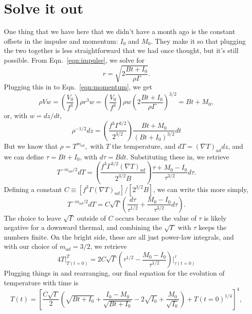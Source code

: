 \documentclass[onecolumn, amsmath, amsfonts, amssymb]{aastex62}
\newcommand{\grad}{\ensuremath{\nabla}}
\begin{document}
\section{Solve it out}
One thing that we have here that we didn't have a month ago is the constant offsets in
the impulse and momentum: $I_0$ and $M_0$.  They make it so that plugging the two together
is less straightforward that we had once thought, but it's still possible. From 
Eqn.~\ref{eqn:impulse}, we solve for
\begin{equation}
r = \sqrt{2\frac{B t + I_0}{\rho\Gamma}}.
\end{equation}
Plugging this in to Eqn.~\ref{eqn:momentum}, we get
\begin{equation}
\rho V w = \left(\frac{V_0}{f^3}\right)\rho r^3 w
= \left(\frac{V_0}{f^3}\right)\rho w \left(2\frac{B t + I_0}{\rho\Gamma}\right)^{3/2} = Bt + M_0,
\end{equation}
or, with $w = dz/dt$,
\begin{equation}
\rho^{-1/2}dz = \left(\frac{f^3 \Gamma^{3/2}}{2^{3/2}}\right)\frac{Bt + M_0}{(Bt + I_0)^{3/2}}dt
\end{equation}
But we know that $\rho = T^{m_{ad}},$ with $T$ the temperature, and $dT = (\grad T)_{ad} dz$,
and we can define $\tau = Bt + I_0$, with $d\tau = B dt$. Substituting these in, we retrieve
\begin{equation}
T^{-m_{ad}/2}dT 
= \left(\frac{f^3 \Gamma^{3/2}(\grad T)_{ad}}{2^{3/2} B}\right)\frac{\tau + M_0 - I_0}{\tau^{3/2}}d\tau.
\end{equation}
Defining a constant $C \equiv [f^3 \Gamma(\grad T)_{ad}]/[2^{3/2} B]$, we can write this more simply,
\begin{equation}
T^{-m_{ad}/2}dT = C\sqrt{\Gamma}\left(\frac{d\tau}{\tau^{1/2}} + \frac{M_0 - I_0}{\tau^{3/2}}d\tau\right).
\end{equation}
The choice to leave $\sqrt{\Gamma}$ outside of $C$ occurs because the value of $\tau$ is likely
negative for a downward thermal, and combining the $\sqrt{\Gamma}$ with $\tau$ keeps the 
numbers finite. On the bright side, these are all just power-law integrals, and with our choice 
of $m_{ad} = 3/2$, we retrieve
\begin{equation}
4 T\bigg|_{T(t=0)}^{T} 
= 2C\sqrt{\Gamma}\left(\tau^{1/2} - \frac{M_0 - I_0}{\tau^{1/2}}\right)\bigg|_{\tau(t=0)}^{\tau}
\end{equation}
Plugging things in and rearranging, our final equation for the evolution of temperature with time
is
\begin{equation}
T(t) = \left[\frac{C\sqrt{\Gamma}}{2}
\left(\sqrt{Bt + I_0} + \frac{I_0 - M_0}{\sqrt{Bt + I_0}} - 2\sqrt{I_0} + \frac{M_0}{\sqrt{I_0}}\right)
+ T(t=0)^{1/4}\right]^{4},
\end{equation}
\end{document}
